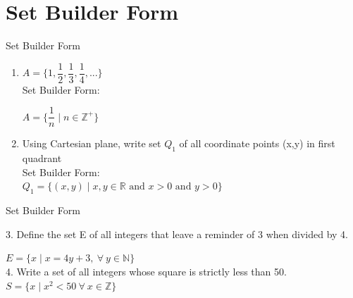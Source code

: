 \documentclass{beamer}
\begin{document}
\section{Set Builder Form}
\begin{frame}{Set Builder Form}

\begin{enumerate}
    \item $A=\{ 1,\dfrac{1}{2},\dfrac{1}{3},\dfrac{1}{4},... \}$ \\
    \vspace{1ex}
    Set Builder Form: \\
    \vspace{1ex}
    
    \pause
     \hspace{6em} $A=\{\dfrac{1}{n} \mid n \in \mathbb{Z}^+ \}$
     \vspace{2ex}
     \pause
    \item Using Cartesian plane, write set $ Q_1$ of all coordinate points (x,y) in first quadrant \\
    \vspace{1ex}
      Set Builder Form: \\
    \vspace{1ex}
    \pause
     \hspace{3em} $ Q_1=\{(x,y)\mid x,y \in \mathbb{R} \text{ and } x>0 \text{ and } y>0 \}$
\end{enumerate}
\end{frame}

\begin{frame}{Set Builder Form}

3. Define the set E of all integers that leave a reminder of 3 when divided by 4.\\

\vspace{1ex}

\pause

\hspace{6em} $E= \{ x \mid x=4y+3, \ \forall \ y\in\mathbb{N}\}$ \\
\pause
\vspace{1ex}
4. Write a set of all integers whose square is strictly less than 50.\\
\vspace{1em}
\pause
\hspace{6em} 
$  S=\{x\mid x^2<50\ \forall\ x \in\mathbb{Z}\} $
    
\end{frame}
\end{document}
